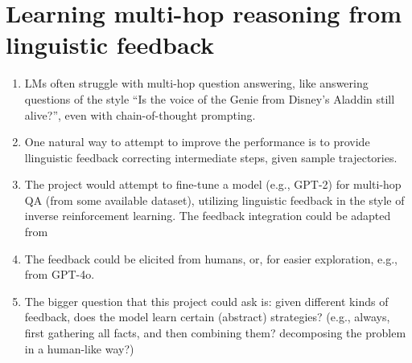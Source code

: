 \documentclass[fleqn,reqno,10pt]{article}
\begin{document}
\section{Learning multi-hop reasoning from linguistic feedback}
\begin{enumerate}
	\item LMs often struggle with multi-hop question answering, like answering questions of the style ``Is the voice of the Genie from Disney’s Aladdin still alive?'', even with chain-of-thought prompting.
	\item One natural way to attempt to improve the performance is to provide llinguistic feedback correcting intermediate steps, given sample trajectories.
	\item The project would attempt to fine-tune a model (e.g., GPT-2) for multi-hop QA (from some available dataset), utilizing linguistic feedback in the style of inverse reinforcement learning. The feedback integration could be adapted from \citep{sumers2021learning}
	\item The feedback could be elicited from humans, or, for easier exploration, e.g., from GPT-4o.
	\item The bigger question that this project could ask is: given different kinds of feedback, does the model learn certain (abstract) strategies? (e.g., always, first gathering all facts, and then combining them? decomposing the problem in a human-like way?)
\end{enumerate}

\end{document}
